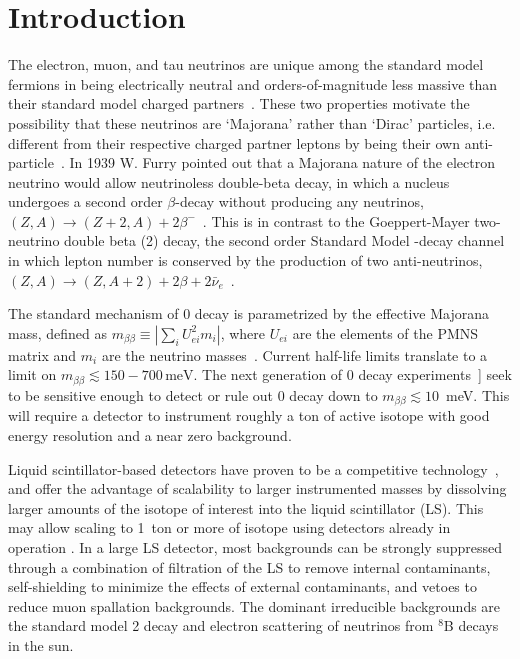 \section{Introduction}

The electron, muon, and tau neutrinos are unique among the standard
model fermions in being electrically neutral and orders-of-magnitude
less massive than their standard model charged
partners~\cite{PDG_mass}.  These two properties motivate the
possibility that these neutrinos are `Majorana' rather than `Dirac'
particles, i.e. different from their respective charged partner
leptons by being their own
anti-particle~\cite{Majorana1937,pdg_vogel_piepke}. In 1939 W. Furry
pointed out that a Majorana nature of the electron neutrino would
allow neutrinoless double-beta decay, in which a nucleus undergoes a
second order $\beta$-decay without producing any neutrinos,
$(Z,A)\rightarrow(Z+2,A)+2\beta^-$~\cite{Furry1939}.  This is in
contrast to the Goeppert-Mayer two-neutrino double beta (2{\nbb})
decay, the second order Standard Model \bmd-decay channel in which
lepton number is conserved by the production of two anti-neutrinos,
\mbox{$(Z,A)\rightarrow(Z,A+2)+2\beta+2\bar\nu_e$}~\cite{GoeppertMayer1935}.

The standard mechanism of 0{\nbb} decay is parametrized by the
effective Majorana mass, defined as
\mbox{$m_{\beta\beta}\equiv\left|\sum_i U^2_{ei}m_i\right|$}, where
$U_{ei}$ are the elements of the PMNS matrix and $m_i$ are the
neutrino masses~\cite{pdg_vogel_piepke}. Current half-life limits
translate to a limit on \mbox{$m_{\beta\beta}\lesssim
150-700\,\mathrm{meV}$}.  The next generation of 0{\nbb} decay
experiments~]\cite{pdg_vogel_piepke} seek to be sensitive enough to
detect or rule out 0{\nbb} decay down to \mbox{$m_{\beta\beta}\lesssim
10$~meV}. This will require a detector to instrument roughly a ton of
active isotope with good energy resolution and a near zero background.

Liquid scintillator-based detectors have proven to be a competitive
technology~\cite{KamLANDZen2013}, and offer the advantage of
scalability to larger instrumented masses by dissolving larger amounts
of the isotope of interest into the liquid scintillator (LS).  This
may allow scaling to 1~ton or more of isotope using detectors already
in operation \cite{Biller2013}.  In a large LS detector, most
backgrounds can be strongly suppressed through a combination of
filtration of the LS to remove internal contaminants, self-shielding
to minimize the effects of external contaminants, and vetoes to reduce
muon spallation backgrounds. The dominant irreducible backgrounds are
the standard model 2{\nbb} decay and electron scattering of 
neutrinos from $^8$B decays in the sun.

